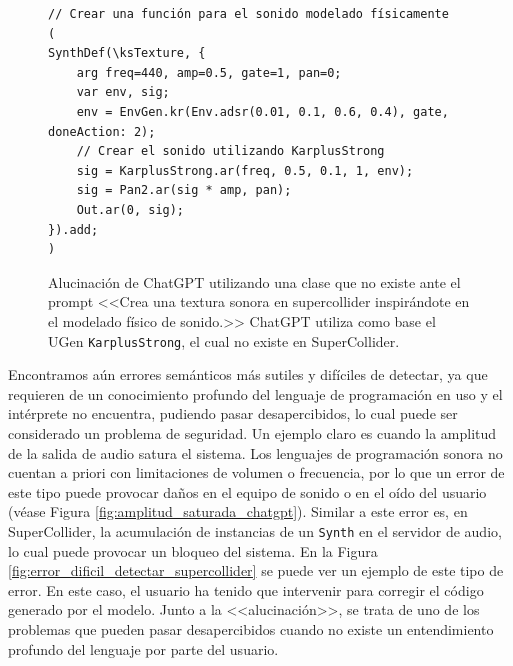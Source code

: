 \begin{figure}[H]
    \caption[Alucinación de ChatGPT utilizando una clase que no existe]{Alucinación de ChatGPT utilizando una clase que no existe ante el prompt <<Crea una textura sonora en supercollider inspirándote en el modelado físico de sonido.>> ChatGPT utiliza como base el UGen \texttt{KarplusStrong}, el cual no existe en SuperCollider.}
    \centering
    \begin{lstlisting}[style=SuperCollider-IDE, basicstyle=\footnotesize\ttfamily, numbers=none]
// Crear una función para el sonido modelado físicamente
(
SynthDef(\ksTexture, {
    arg freq=440, amp=0.5, gate=1, pan=0;
    var env, sig;
    env = EnvGen.kr(Env.adsr(0.01, 0.1, 0.6, 0.4), gate, doneAction: 2);
    // Crear el sonido utilizando KarplusStrong
    sig = KarplusStrong.ar(freq, 0.5, 0.1, 1, env);
    sig = Pan2.ar(sig * amp, pan);
    Out.ar(0, sig);
}).add;
)
    \end{lstlisting}
    \label{fig:alucinacion_chatgpt}
\end{figure}


Encontramos aún errores semánticos más sutiles y difíciles de detectar, ya que requieren de un conocimiento profundo del lenguaje de programación en uso y el intérprete no encuentra, pudiendo pasar desapercibidos, lo cual puede ser considerado un problema de seguridad. Un ejemplo claro es cuando la amplitud de la salida de audio satura el sistema. Los lenguajes de programación sonora no cuentan a priori con limitaciones de volumen o frecuencia, por lo que un error de este tipo puede provocar daños en el equipo de sonido o en el oído del usuario (véase Figura \ref{fig:amplitud_saturada_chatgpt}). Similar a este error es, en SuperCollider, la acumulación de instancias de un \texttt{Synth} en el servidor de audio, lo cual puede provocar un bloqueo del sistema. En la Figura \ref{fig:error_dificil_detectar_supercollider} se puede ver un ejemplo de este tipo de error. En este caso, el usuario ha tenido que intervenir para corregir el código generado por el modelo. Junto a la <<alucinación>>, se trata de uno de los problemas que pueden pasar desapercibidos cuando no existe un entendimiento profundo del lenguaje por parte del usuario.

